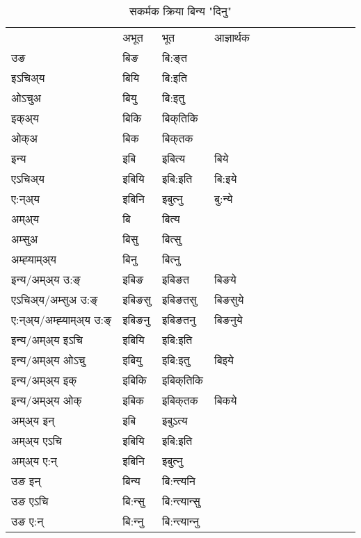 \begin{table}[H]
\centering
\caption{\label{i.vt} सकर्मक क्रिया  बिन्य  "दिनु"  }
\begin{tabular}{l|l|l|l|l|l|l|l|l|l|l|l|l}  \toprule
&अभूत & भूत & आज्ञार्थक \\ 
उङ &बिङ &बि:ङ्‌त \\ 
इऽचिअ्य &बियि &बि:इति   \\ 
ओऽचुअ &बियु &बि:इतु   \\ 
इक्अ्य &बिकि &बिक्‌तिकि   \\ 
ओक्अ &बिक &बिक्‌तक   \\ 
इन्य & इबि & इबित्य &बिये  \\ 
एऽचिअ्य & इबियि & इबि:इति &बि:इये    \\ 
ए:न्अ्य & इबिनि  & इबुत्‍नु &बु:न्ये  \\ 
अम्अ्य & बि & बित्य   \\ 
अम्सुअ & बिसु & बित्सु     \\ 
अम्ह्‍याम्अ्य & बिनु  & बित्‍नु \\ 
\midrule
इन्य/अम्अ्य उ:ङ्‌&इबिङ &इबिङत &बिङये \\ 
एऽचिअ्य/अम्सुअ उ:ङ्‌ &इबिङसु &इबिङतसु &बिङसुये \\ 
ए:न्अ्य/अम्ह्‍याम्अ्य उ:ङ्‌ &इबिङनु &इबिङतनु &बिङनुये \\ 
इन्य/अम्अ्य इऽचि &इबियि &इबि:इति    \\ 
इन्य/अम्अ्य ओऽचु &इबियु &इबि:इतु  &बिइये  \\ 
इन्य/अम्अ्य इक् &इबिकि &इबिक्‌तिकि   \\ 
इन्य/अम्अ्य ओक् &इबिक &इबिक्‌तक  &बिकये  \\ 
अम्अ्य इन् & इबि & इबुऽत्य   \\ 
अम्अ्य एऽचि & इबियि & इबि:इति     \\ 
अम्अ्य ए:न् & इबिनि  & इबुत्‍नु  \\ 
\midrule
उङ इन् & बिन्य  & बि:न्त्यनि  \\ 
उङ एऽचि & बि:न्सु  & बि:न्त्यान्सु   \\ 
उङ ए:न्& बि:न्‍नु  & बि:न्त्यान्‍नु   \\ 
\bottomrule
\end{tabular}
\end{table}



